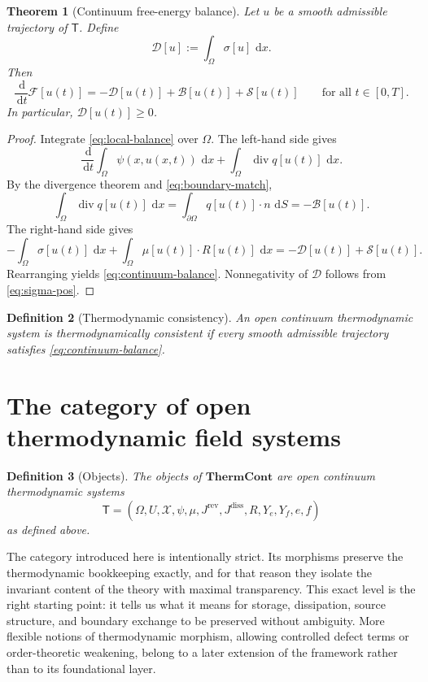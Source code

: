 \documentclass[11pt]{article}
\newtheorem{theorem}{Theorem}[section]
\newtheorem{definition}[theorem]{Definition}
\newcommand{\Om}{\Omega}
\newcommand{\pa}{\partial}
\newcommand{\diver}{\operatorname{div}}
\newcommand{\dd}{\,\mathrm{d}}
\newcommand{\F}{\mathcal{F}}
\newcommand{\X}{\mathcal{X}}
\newcommand{\Diss}{\mathcal{D}}
\newcommand{\Bnd}{\mathcal{B}}
\newcommand{\Src}{\mathcal{S}}
\newcommand{\ThermCont}{\mathbf{ThermCont}}
\begin{document}
\begin{theorem}[Continuum free-energy balance]\label{thm:continuum-balance}
Let \(u\) be a smooth admissible trajectory of \(\mathsf{T}\). Define
\begin{equation}\label{eq:Diss-def}
\Diss[u]
:=
\int_\Om \sigma[u]\,\dd x.
\end{equation}
Then
\begin{equation}\label{eq:continuum-balance}
\frac{\dd}{\dd t}\F[u(t)]
=
-\Diss[u(t)] + \Bnd[u(t)] + \Src[u(t)]
\qquad \text{for all }t\in[0,T].
\end{equation}
In particular, \(\Diss[u(t)]\ge 0\).
\end{theorem}

\begin{proof}
Integrate \eqref{eq:local-balance} over \(\Om\). The left-hand side gives
\[
\frac{\dd}{\dd t}\int_\Om \psi(x,u(x,t))\,\dd x
+
\int_\Om \diver q[u(t)]\,\dd x.
\]
By the divergence theorem and \eqref{eq:boundary-match},
\[
\int_\Om \diver q[u(t)]\,\dd x
=
\int_{\pa\Om} q[u(t)]\cdot n\,\dd S
=
-\Bnd[u(t)].
\]
The right-hand side gives
\[
-\int_\Om \sigma[u(t)]\,\dd x
+
\int_\Om \mu[u(t)]\cdot R[u(t)]\,\dd x
=
-\Diss[u(t)] + \Src[u(t)].
\]
Rearranging yields \eqref{eq:continuum-balance}. Nonnegativity of \(\Diss\) follows
from \eqref{eq:sigma-pos}.
\end{proof}

\begin{definition}[Thermodynamic consistency]
An open continuum thermodynamic system is \emph{thermodynamically consistent} if every
smooth admissible trajectory satisfies \eqref{eq:continuum-balance}.
\end{definition}

\section{The category of open thermodynamic field systems}

\begin{definition}[Objects]
The objects of \(\ThermCont\) are open continuum thermodynamic systems
\[
\mathsf{T}
=
(\Om,U,\X,\psi,\mu,J^{\mathrm{rev}},J^{\mathrm{diss}},R,Y_e,Y_f,e,f)
\]
as defined above.
\end{definition}

The category introduced here is intentionally strict. Its morphisms preserve the
thermodynamic bookkeeping exactly, and for that reason they isolate the invariant
content of the theory with maximal transparency. This exact level is the right
starting point: it tells us what it means for storage, dissipation, source structure,
and boundary exchange to be preserved without ambiguity. More flexible notions of
thermodynamic morphism, allowing controlled defect terms or order-theoretic
weakening, belong to a later extension of the framework rather than to its
foundational layer.
\end{document}
